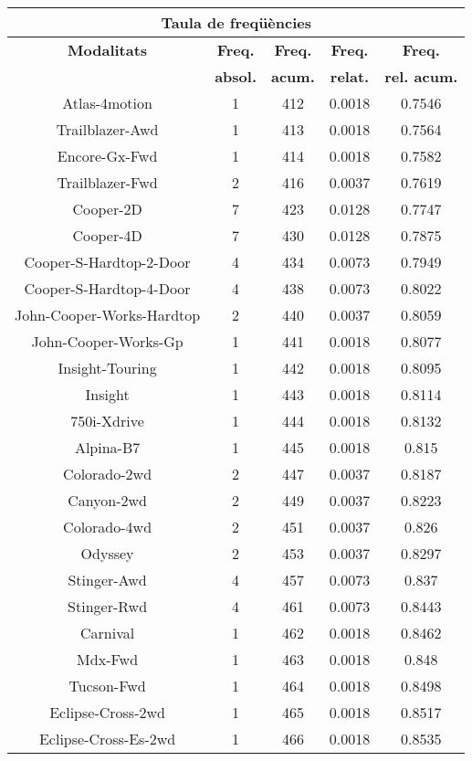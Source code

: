 \begin{center}
\begin{tabular}{|c|c|c|c|@{}c@{}|}
\hline
\multicolumn{5}{|c|}{\bf Taula de freq\" u\`encies} \\ 
\hline
{\bf Modalitats} & {\bf Freq.} & {\bf Freq.} & {\bf Freq.} & {\bf Freq.} \\ 
 & {\bf absol.} & {\bf acum.} & {\bf relat.} & {\bf rel. acum.} \\ 
\hline
\hline
Atlas-4motion & 1 & 412 & 0.0018 & 0.7546 \\ 
Trailblazer-Awd & 1 & 413 & 0.0018 & 0.7564 \\ 
Encore-Gx-Fwd & 1 & 414 & 0.0018 & 0.7582 \\ 
Trailblazer-Fwd & 2 & 416 & 0.0037 & 0.7619 \\ 
Cooper-2D & 7 & 423 & 0.0128 & 0.7747 \\ 
Cooper-4D & 7 & 430 & 0.0128 & 0.7875 \\ 
Cooper-S-Hardtop-2-Door & 4 & 434 & 0.0073 & 0.7949 \\ 
Cooper-S-Hardtop-4-Door & 4 & 438 & 0.0073 & 0.8022 \\ 
John-Cooper-Works-Hardtop & 2 & 440 & 0.0037 & 0.8059 \\ 
John-Cooper-Works-Gp & 1 & 441 & 0.0018 & 0.8077 \\ 
Insight-Touring & 1 & 442 & 0.0018 & 0.8095 \\ 
Insight & 1 & 443 & 0.0018 & 0.8114 \\ 
750i-Xdrive & 1 & 444 & 0.0018 & 0.8132 \\ 
Alpina-B7 & 1 & 445 & 0.0018 & 0.815 \\ 
Colorado-2wd & 2 & 447 & 0.0037 & 0.8187 \\ 
Canyon-2wd & 2 & 449 & 0.0037 & 0.8223 \\ 
Colorado-4wd & 2 & 451 & 0.0037 & 0.826 \\ 
Odyssey & 2 & 453 & 0.0037 & 0.8297 \\ 
Stinger-Awd & 4 & 457 & 0.0073 & 0.837 \\ 
Stinger-Rwd & 4 & 461 & 0.0073 & 0.8443 \\ 
Carnival & 1 & 462 & 0.0018 & 0.8462 \\ 
Mdx-Fwd & 1 & 463 & 0.0018 & 0.848 \\ 
Tucson-Fwd & 1 & 464 & 0.0018 & 0.8498 \\ 
Eclipse-Cross-2wd & 1 & 465 & 0.0018 & 0.8517 \\ 
Eclipse-Cross-Es-2wd & 1 & 466 & 0.0018 & 0.8535 \\ 

\end{tabular}
\end{center}
